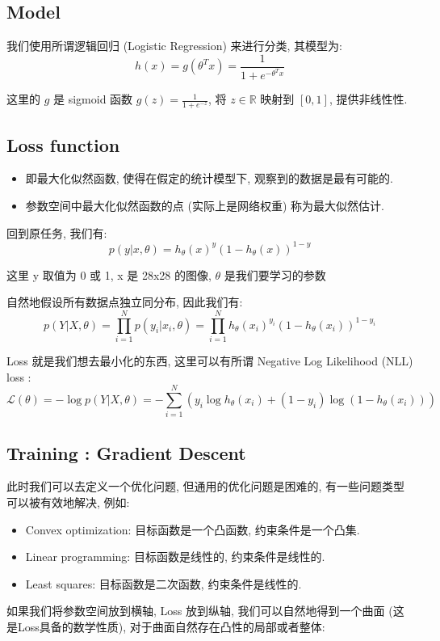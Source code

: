 \documentclass[lang=cn,10pt,green]{elegantbook}
\begin{document}
\subsection{Model}
我们使用所谓逻辑回归 (Logistic Regression) 来进行分类, 其模型为:
$$h(x) = g(\theta^T x) = \frac{1}{1 + e^{-\theta^T x}}$$
\begin{note}
    这里的 $g$ 是 sigmoid 函数 $g(z) = \frac{1}{1 + e^{-z}}$, 将 $z\in \mathbb{R}$ 映射到 $[0, 1]$, 提供非线性性.
\end{note}
\subsection{Loss function}
\begin{definition}[最大似然估计]
    \begin{itemize}
        \item 即最大化似然函数, 使得在假定的统计模型下, 观察到的数据是最有可能的.
        \item 参数空间中最大化似然函数的点 (实际上是网络权重) 称为最大似然估计.
    \end{itemize}
\end{definition}
回到原任务, 我们有:
$$ p(y|x, \theta) = h_{\theta}(x)^y (1 - h_{\theta}(x))^{1-y} $$
\begin{note}
    这里 y 取值为 0 或 1, x 是 28x28 的图像, $\theta$ 是我们要学习的参数
\end{note}
自然地假设所有数据点独立同分布, 因此我们有:
$$ p(Y|X, \theta) = \prod_{i=1}^N p(y_i|x_i, \theta) = \prod_{i=1}^N h_{\theta}(x_i)^{y_i} (1 - h_{\theta}(x_i))^{1-y_i} $$

Loss 就是我们想去最小化的东西, 这里可以有所谓 Negative Log Likelihood (NLL) loss :
$$ \mathcal{L}({\theta}) = -\log p(Y|X, \theta) = -\sum_{i=1}^N \left( y_i \log h_{\theta}(x_i) + (1 - y_i) \log (1 - h_{\theta}(x_i)) \right) $$
\clearpage
\subsection{Training : Gradient Descent}
此时我们可以去定义一个优化问题, 但通用的优化问题是困难的, 有一些问题类型可以被有效地解决, 例如:
\begin{itemize}
    \item Convex optimization: 目标函数是一个凸函数, 约束条件是一个凸集.
    \item Linear programming: 目标函数是线性的, 约束条件是线性的.
    \item Least squares: 目标函数是二次函数, 约束条件是线性的.
\end{itemize}
如果我们将参数空间放到横轴, Loss 放到纵轴, 我们可以自然地得到一个曲面 (这是Loss具备的数学性质), 对于曲面自然存在凸性的局部或者整体:
\end{document}
